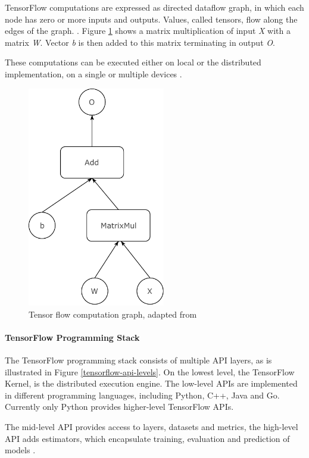 TensorFlow computations are expressed as directed dataflow graph, in
which each node has zero or more inputs and outputs. Values, called
tensors, flow along the edges of the graph. \cite{dean-tensor}. Figure
\ref{tensor-flow-graph} shows a matrix multiplication of input \emph{X}
with a matrix \emph{W}. Vector \emph{b} is then added to this matrix
terminating in output \emph{O}.

These computations can be executed either on local or the distributed
implementation, on a single or multiple devices \cite{dean-tensor}.

\begin{figure}
\centering
\includegraphics[width=6.00000cm]{images/tensorflow_comp_graph}
\caption{Tensor flow computation graph, adapted from \cite{dean-tensor}
\label{tensor-flow-graph}}
\end{figure}

\paragraph{TensorFlow Programming
Stack}\label{tensorflow-programming-stack}

The TensorFlow programming stack consists of multiple API layers, as is
illustrated in Figure \ref{tensorflow-api-levels}. On the lowest level,
the TensorFlow Kernel, is the distributed execution engine. The
low-level APIs are implemented in different programming languages,
including Python, C++, Java and Go. Currently only Python provides
higher-level TensorFlow APIs.

The mid-level API provides access to layers, datasets and metrics, the
high-level API adds estimators, which encapsulate training, evaluation
and prediction of models \cite{tensorflow-estimators}.

